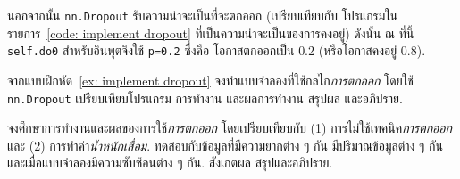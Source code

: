 นอกจากนั้น 
\verb|nn.Dropout|
รับความน่าจะเป็นที่จะตกออก (เปรียบเทียบกับ โปรแกรมในรายการ~\ref{code: implement dropout} ที่เป็นความน่าจะเป็นของการคงอยู่)
ดังนั้น ณ ที่นี้ \verb|self.do0| สำหรับอินพุตจึงใช้ \verb|p=0.2| ซึ่งคือ โอกาสตกออกเป็น $0.2$ (หรือโอกาสคงอยู่ $0.8$).



%

\begin{Exercise}
	\label{ex: dropout built-in}
	จากแบบฝึกหัด~\ref{ex: implement dropout}
	จงทำแบบจำลองที่ใช้กลไก\textit{การตกออก} โดยใช้ \texttt{nn.Dropout}
	เปรียบเทียบโปรแกรม การทำงาน และผลการทำงาน
	สรุปผล และอภิปราย.
	
\end{Exercise}

\begin{Exercise}
	\label{ex: dropout behavior}

จงศึกษาการทำงานและผลของการใช้\textit{การตกออก}
โดยเปรียบเทียบกับ (1) การไม่ใช้เทคนิค\textit{การตกออก}
และ
(2) การทำค่า\textit{น้ำหนักเสื่อม}.
ทดสอบกับข้อมูลที่มีความยากต่าง ๆ กัน มีปริมาณข้อมูลต่าง ๆ กัน และเมื่อแบบจำลองมีความซับซ้อนต่าง ๆ กัน.
สังเกตผล สรุปและอภิปราย.

\end{Exercise}



